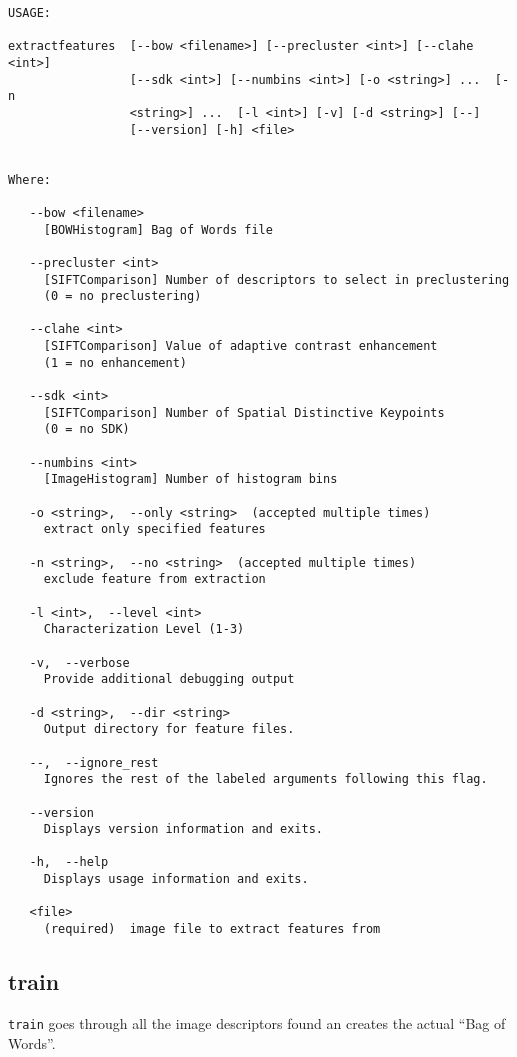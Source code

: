 \documentclass{hitec}
\begin{document}
\begin{verbatim}
USAGE: 

extractfeatures  [--bow <filename>] [--precluster <int>] [--clahe <int>]
                 [--sdk <int>] [--numbins <int>] [-o <string>] ...  [-n
                 <string>] ...  [-l <int>] [-v] [-d <string>] [--]
                 [--version] [-h] <file>


Where: 

   --bow <filename>
     [BOWHistogram] Bag of Words file

   --precluster <int>
     [SIFTComparison] Number of descriptors to select in preclustering 
	 (0 = no preclustering)

   --clahe <int>
     [SIFTComparison] Value of adaptive contrast enhancement 
	 (1 = no enhancement)

   --sdk <int>
     [SIFTComparison] Number of Spatial Distinctive Keypoints 
	 (0 = no SDK)

   --numbins <int>
     [ImageHistogram] Number of histogram bins

   -o <string>,  --only <string>  (accepted multiple times)
     extract only specified features

   -n <string>,  --no <string>  (accepted multiple times)
     exclude feature from extraction

   -l <int>,  --level <int>
     Characterization Level (1-3)

   -v,  --verbose
     Provide additional debugging output

   -d <string>,  --dir <string>
     Output directory for feature files.

   --,  --ignore_rest
     Ignores the rest of the labeled arguments following this flag.

   --version
     Displays version information and exits.

   -h,  --help
     Displays usage information and exits.

   <file>
     (required)  image file to extract features from
\end{verbatim}

\subsection{train}

\texttt{train} goes through all the image descriptors found an creates the
actual ``Bag of Words''. 
\end{document}
